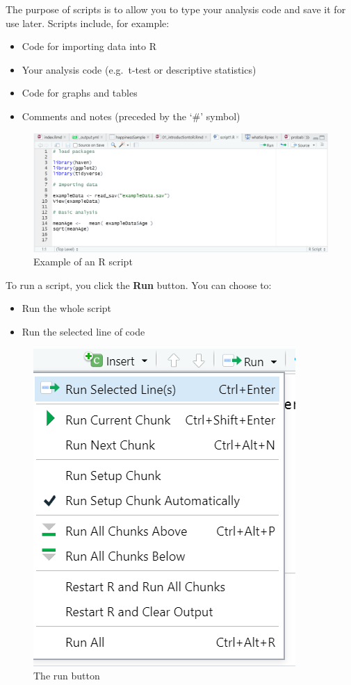 \documentclass[
]{book}
\providecommand{\tightlist}{%
  \setlength{\itemsep}{0pt}\setlength{\parskip}{0pt}}
\begin{document}
The purpose of scripts is to allow you to type your analysis code and save it for use later. Scripts include, for example:

\begin{itemize}
\tightlist
\item
  Code for importing data into R
\item
  Your analysis code (e.g.~t-test or descriptive statistics)
\item
  Code for graphs and tables
\item
  Comments and notes (preceded by the `\#' symbol)
\end{itemize}

\begin{figure}
\centering
\includegraphics{images/script.png}
\caption{Example of an R script}
\end{figure}

To run a script, you click the \textbf{Run} button. You can choose to:

\begin{itemize}
\tightlist
\item
  Run the whole script
\item
  Run the selected line of code
\end{itemize}

\begin{figure}
\centering
\includegraphics{images/run.png}
\caption{The run button}
\end{figure}
\end{document}
